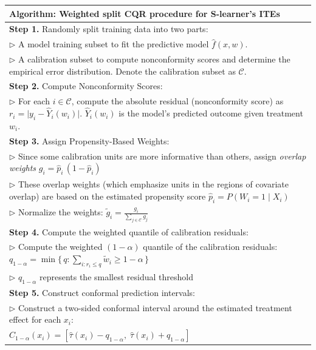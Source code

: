 \protect{}\label{tab:ites}
{\def\LTcaptype{none} %
\begin{longtable}[]{@{}
  >{\raggedright\arraybackslash}p{}@{}}
\toprule\noalign{}
\begin{minipage}[b]{\linewidth}\raggedright
\textbf{Algorithm}: Weighted split CQR procedure for S-learner's ITEs
\end{minipage} \\
\midrule\noalign{}
\endhead
\bottomrule\noalign{}
\endlastfoot
\textbf{Step 1.} Randomly split training data into two parts: \\
\(\triangleright\) A model training subset to fit the predictive model \(\widehat{f}(x,w)\). \\
\(\triangleright\) A calibration subset to compute nonconformity scores and determine the empirical error distribution. Denote the calibration subset as \(\mathcal{C}.\) \\
\textbf{Step 2.} Compute Nonconformity Scores: \\
\(\triangleright\) For each \(i\in\mathcal{C}\), compute the absolute residual (nonconformity score) as \(r_{i}=\big|y_{i}-\widehat{Y}_{i}(w_{i})\big|\). \(\widehat{Y}_{i}(w_{i})\) is the model's predicted outcome given treatment \(w_{i}\). \\
\textbf{Step 3.} Assign Propensity-Based Weights: \\
\(\triangleright\) Since some calibration units are more informative than others, assign \emph{overlap weights} \(g_{i}=\widehat{p}_{i}\,(1-\widehat{p}_{i})\) \\
\(\triangleright\) These overlap weights (which emphasize units in the regions of covariate overlap) are based on the estimated propensity score \(\widehat{p}_{i}=P(W_{i}=1\mid X_{i})\) \\
\(\triangleright\) Normalize the weights: \(\tilde{g}_{i}=\frac{g_{i}}{\sum_{j\in\mathcal{C}}g_{j}}\) \\
\textbf{Step 4.} Compute the weighted quantile of calibration residuals: \\
\(\triangleright\) Compute the weighted \((1-\alpha)\) quantile of the calibration residuals: \(q_{1-\alpha} = \min\{\, q : \sum_{i : r_i \le q} \tilde{w}_i \ge 1-\alpha \,\}\) \\
\(\triangleright\) \(q_{1-\alpha}\) represents the smallest residual threshold \\
\textbf{Step 5.} Construct conformal prediction intervals: \\
\(\triangleright\) Construct a two-sided conformal interval around the estimated treatment effect for each \(x_{i}\): \\
\(\widehat{C}_{1-\alpha}(x_{i})=\left[\widehat{\tau}(x_{i})-q_{1-\alpha},\;\widehat{\tau}(x_{i})+q_{1-\alpha}\right]\) \\
\end{longtable}
}

